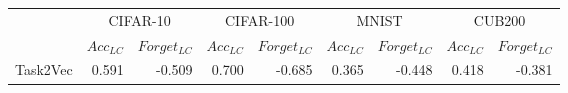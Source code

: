 \begin{table}[h]
\centering
\begin{tabular}{lrrrrrrrr}
\toprule
{} & \multicolumn{2}{c}{CIFAR-10} & \multicolumn{2}{c}{CIFAR-100} & \multicolumn{2}{c}{MNIST} & \multicolumn{2}{c}{CUB200} \\
{} & $Acc_{LC}$ & $Forget_{LC}$ & $Acc_{LC}$ & $Forget_{LC}$ & $Acc_{LC}$ & $Forget_{LC}$ & $Acc_{LC}$ & $Forget_{LC}$ \\
\midrule
Task2Vec &      0.591 &        -0.509 &      0.700 &        -0.685 &      0.365 &        -0.448 &      0.418 &        -0.381 \\
\bottomrule
\end{tabular}
\end{table}
